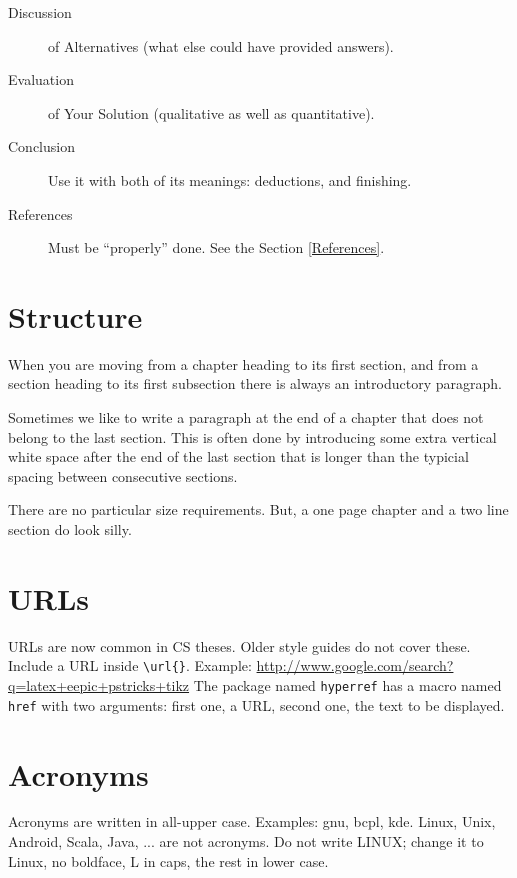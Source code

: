 \begin{description}
\item
  [Discussion] of Alternatives (what else could have provided answers).

\item
  [Evaluation] of Your Solution (qualitative as well as quantitative).

\item
  [Conclusion] Use it with both of its meanings: deductions, and
  finishing.

\item
  [References] Must be ``properly'' done.  See the Section
  \ref{References}.


\end{description}

\section{Structure}

When you are moving from a chapter heading to its first section, and
from a section heading to its first subsection there is always an
introductory paragraph.

Sometimes we like to write a paragraph at the end of a chapter that
does not belong to the last section.  This is often done by
introducing some extra vertical white space after the end of the last
section that is longer than the typicial spacing between consecutive
sections.

There are no particular size requirements.  But, a one page chapter
and a two line section do look silly.

\section{URLs}

URLs are now common in CS theses.  Older style guides do not cover
these.  Include a URL inside \verb|\url{}|. Example:
\url{http://www.google.com/search?q=latex+eepic+pstricks+tikz}
The package named {\tt hyperref} has a macro named \verb|href| with
two arguments: first one, a URL, second one, the text to be displayed.


\section{Acronyms}

Acronyms are written in all-upper case.  Examples: {\sc gnu}, {\sc
  bcpl}, {\sc kde}.  Linux, Unix, Android, Scala, Java, ... are not
acronyms.  Do not write LINUX; change it to Linux, no boldface, L in
caps, the rest in lower case.

